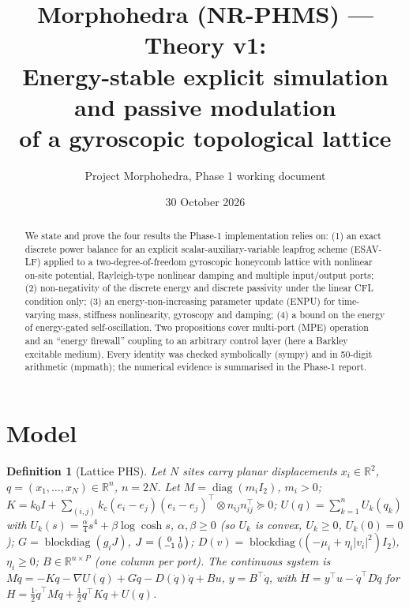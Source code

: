 \documentclass[11pt]{article}
\title{Morphohedra (NR-PHMS) --- Theory v1:\\ Energy-stable explicit simulation and passive modulation\\ of a gyroscopic topological lattice}
\author{Project Morphohedra, Phase 1 working document}
\date{30 October 2026}
\newtheorem{definition}{Definition}
\theoremstyle{remark}\newtheorem{remark}{Remark}
\newcommand{\R}{\mathbb{R}}
\begin{document}
\maketitle
\begin{abstract}
We state and prove the four results the Phase-1 implementation relies on: (1) an exact discrete power balance for an explicit
scalar-auxiliary-variable leapfrog scheme (ESAV-LF) applied to a two-degree-of-freedom gyroscopic honeycomb lattice with
nonlinear on-site potential, Rayleigh-type nonlinear damping and multiple input/output ports; (2) non-negativity of the
discrete energy and discrete passivity under the linear CFL condition only; (3) an energy-non-increasing parameter update
(ENPU) for time-varying mass, stiffness nonlinearity, gyroscopy and damping; (4) a bound on the energy of energy-gated
self-oscillation. Two propositions cover multi-port (MPE) operation and an ``energy firewall'' coupling to an arbitrary
control layer (here a Barkley excitable medium). Every identity was checked symbolically (sympy) and in 50-digit arithmetic
(mpmath); the numerical evidence is summarised in the Phase-1 report.
\end{abstract}

\section{Model}
\begin{definition}[Lattice PHS]
Let $N$ sites carry planar displacements $x_i\in\R^2$, $q=(x_1,\dots,x_N)\in\R^{n}$, $n=2N$. Let
$M=\operatorname{diag}(m_iI_2)$, $m_i>0$;
$K=k_0I+\sum_{(i,j)}k_c(e_i-e_j)(e_i-e_j)^\top\otimes n_{ij}n_{ij}^\top\succeq0$;
$U(q)=\sum_{k=1}^{n}U_k(q_k)$ with $U_k(s)=\tfrac{\alpha}{4}s^4+\beta\log\cosh s$, $\alpha,\beta\ge0$ (so $U_k$ is convex,
$U_k\ge0$, $U_k(0)=0$); $G=\operatorname{blockdiag}(g_iJ)$, $J=\begin{psmallmatrix}0&1\\-1&0\end{psmallmatrix}$;
$D(v)=\operatorname{blockdiag}\big((-\mu_i+\eta_i|v_i|^2)I_2\big)$, $\eta_i\ge0$; $B\in\R^{n\times P}$ (one column per port).
The continuous system is $M\ddot q=-Kq-\nabla U(q)+G\dot q-D(\dot q)\dot q+Bu$, $y=B^\top\dot q$, with
$\dot H=y^\top u-\dot q^\top D\dot q$ for $H=\tfrac12\dot q^\top M\dot q+\tfrac12 q^\top Kq+U(q)$.
\end{definition}
\end{document}
